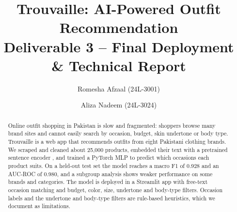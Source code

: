 \documentclass[11pt]{article}
\title{Trouvaille: AI-Powered Outfit Recommendation\\Deliverable 3 -- Final Deployment \& Technical Report}
\author{Romesha Afzaal (24L-3001) \and Aliza Nadeem (24L-3024)}
\date{}
\begin{document}
\maketitle

\begin{abstract}
Online outfit shopping in Pakistan is slow and fragmented: shoppers browse many brand sites and
cannot easily search by occasion, budget, skin undertone or body type. Trouvaille is a web app that
recommends outfits from eight Pakistani clothing brands. We scraped and cleaned about 25,000 products,
embedded their text with a pretrained sentence encoder \cite{reimers2019sbert,wang2020minilm}, and trained
a PyTorch MLP \cite{paszke2019pytorch} to predict which occasions each product suits. On a held-out test set the model reaches
a macro F1 of 0.928 and an AUC-ROC of 0.980, and a subgroup analysis shows weaker performance on some brands and categories.
The model is deployed in a Streamlit app with free-text occasion matching and budget, color, size, undertone and body-type filters.
Occasion labels and the undertone and body-type filters are rule-based heuristics, which we document as limitations.
\end{abstract}




\newcommand{\baseP}{0.896}\newcommand{\baseR}{0.862}\newcommand{\baseF}{0.878}\newcommand{\baseA}{0.948}

\newcommand{\bestLR}{--}\newcommand{\bestBatch}{--}\newcommand{\bestDrop}{--}\newcommand{\bestValF}{--}\newcommand{\bestValAUC}{--}\newcommand{\nConfigs}{12}
\newcommand{\testPrec}{--}\newcommand{\testRec}{--}\newcommand{\testFone}{--}\newcommand{\testAUC}{--}\newcommand{\testMicroF}{--}\newcommand{\testHamming}{--}\newcommand{\testExact}{--}\newcommand{\testN}{--}








\end{document}

